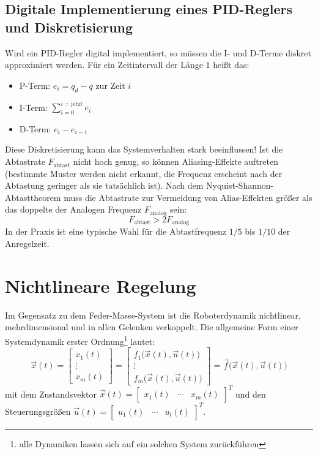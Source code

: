 		\subsection{Digitale Implementierung eines PID-Reglers und Diskretisierung}
			Wird ein PID-Regler digital implementiert, so müssen die I- und D-Terme diskret approximiert werden. Für ein Zeitintervall der Länge \num{1} heißt das:
			\begin{itemize}
				\item P-Term: \tabto{2cm} \( e_i = q_d - q \) zur Zeit \(i\)
				\item I-Term: \tabto{2cm} \( \sum_{i = 0}^{i = \text{jetzt}} e_i \)
				\item D-Term: \tabto{2cm} \( e_i - e_{i - 1} \)
			\end{itemize}
			Diese Diskretisierung kann das Systemverhalten stark beeinflussen! Ist die Abtastrate \( F_\text{abtast} \) nicht hoch genug, so können Aliasing-Effekte auftreten (\dh bestimmte Muster werden nicht erkannt, die Frequenz erscheint nach der Abtastung geringer als sie tatsächlich ist). Nach dem Nyquist-Shannon-Abtasttheorem muss die Abtastrate zur Vermeidung von Alias-Effekten größer als das doppelte der Analogen Frequenz \( F_\text{analog} \) sein:
			\begin{equation*}
				F_\text{abtast} > 2 F_\text{analog}
			\end{equation*}
			In der Praxis ist eine typische Wahl für die Abtastfrequenz \( 1/5 \) bis \( 1/10 \) der Anregelzeit.

	\section{Nichtlineare Regelung}
		Im Gegensatz zu dem Feder-Masse-System ist die Roboterdynamik \iA nichtlinear, mehrdimensional und in allen Gelenken verkoppelt. Die allgemeine Form einer Systemdynamik erster Ordnung\footnote{alle Dynamiken lassen sich auf ein solchen System zurückführen} lautet:
		\begin{equation*}
			\dot{\vec{x}}(t) =
				\begin{bmatrix}
					\dot{x}_1(t) \\
					\vdots \\
					\dot{x}_m(t)
				\end{bmatrix}
			=
				\begin{bmatrix}
					f_1\big(\vec{x}(t), \vec{u}(t)\big) \\
					\vdots \\
					f_m\big(\vec{x}(t), \vec{u}(t)\big)
				\end{bmatrix}
			= \vec{f}\big(\vec{x}(t), \vec{u}(t)\big)
		\end{equation*}
		mit dem Zustandsvektor \( \vec{x}(t) = \begin{bmatrix} x_1(t) & \cdots & x_m(t) \end{bmatrix}^T \) und den Steuerungsgrößen \( \vec{u}(t) = \begin{bmatrix} u_1(t) & \cdots & u_l(t) \end{bmatrix}^T \).
		
